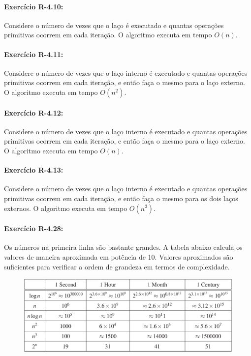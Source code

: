 \paragraph{Exercício R-4.10:}
Considere o número de vezes que o laço é executado e quantas operações primitivas ocorrem em cada iteração. O algoritmo executa em tempo $O(n)$.

\paragraph{Exercício R-4.11:}
Considere o número de vezes que o laço interno é executado e quantas operações primitivas ocorrem em cada iteração, e então faça o mesmo para o laço externo. O algoritmo executa em tempo $O(n^2)$.

\paragraph{Exercício R-4.12:}
Considere o número de vezes que o laço interno é executado e quantas operações primitivas ocorrem em cada iteração, e então faça o mesmo para o laço externo. O algoritmo executa em tempo $O(n)$.

\paragraph{Exercício R-4.13:}
Considere o número de vezes que o laço interno é executado e quantas operações primitivas ocorrem em cada iteração, e então faça o mesmo para os dois laços externos. O algoritmo executa em tempo $O(n^3)$.

\paragraph{Exercício R-4.28:}
Os números na primeira linha são bastante grandes. A tabela abaixo calcula os valores de maneira aproximada em potência de 10. Valores aproximados são suficientes para verificar a ordem de grandeza em termos de complexidade.

\begin{figure}[H]
	\centering
	\includegraphics[width=0.7\linewidth]{img/r-4-28}
\end{figure}

